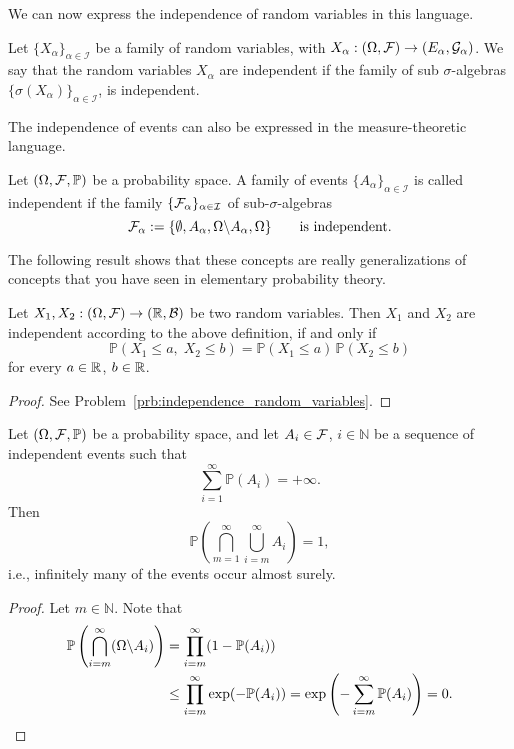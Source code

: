 We can now express the independence of random variables in this language.

\begin{definition}
	Let $\{X_\alpha\}_{\alpha \in \mathcal{I}}$ be a family of random variables, with $X_\alpha:(\Omega, \mathcal F) \to (E_\alpha, \mathcal{G}_\alpha)$. We say that the random variables $X_\alpha$ are independent if the family of sub $\sigma$-algebras $\{\sigma(X_\alpha)\}_{\alpha \in \mathcal{I}}$, is independent.
\end{definition}

The independence of events can also be expressed in the measure-theoretic language.

\begin{definition}
	Let $(\Omega, \mathcal F, \mathbb{P})$ be a probability space. A family of events $\{A_\alpha\}_{\alpha \in \mathcal{I}}$ is called independent if the family $\{ \mathcal F_\alpha \}_{\alpha\in\mathcal{I}}$ of sub-$\sigma$-algebras
	\[
	\mathcal F_\alpha := \{ \emptyset, A_\alpha, \Omega \backslash A_\alpha, \Omega \}\qquad\text{is independent.}
	\]	
\end{definition}

The following result shows that these concepts are really generalizations of concepts that you have seen in elementary probability theory.

\begin{lemma}\label{lem:independence_random_variables}
Let $X_1, X_2: (\Omega, \mathcal F) \to (\mathbb R, \mathcal B)$ be two random variables. Then $X_1$ and $X_2$ are independent according to the above definition, if and only if 
	\[
	\mathbb{P}( X_1 \leq a,\; X_2 \leq b ) = \mathbb{P}(X_1 \leq a)\, \mathbb{P}(X_2 \leq b)
	\]
	for every $a \in \mathbb R$, $b \in \mathbb R$.
\end{lemma}

\begin{proof}
See Problem~\ref{prb:independence_random_variables}.
\end{proof}

\begin{theorem}
	Let $(\Omega, \mathcal F, \mathbb{P})$ be a probability space, and let $A_i \in \mathcal F$, $i \in \mathbb{N}$ be a sequence of independent events such that
	\[
		\sum_{i=1}^\infty \mathbb{P}(A_i) = +\infty.
	\]
	Then
	\[
	\mathbb{P} \left( \bigcap_{m = 1}^\infty \bigcup_{i=m}^\infty A_i \right) = 1,
	\]
	i.e., infinitely many of the events occur almost surely.
\end{theorem}
\begin{proof}
	Let $m \in \mathbb{N}$. Note that
	\begin{align*}
	\mathbb{P}\left(\bigcap_{i=m}^{\infty} (\Omega \backslash A_i) \right) &= 
	\prod_{i=m}^\infty (1 - \mathbb{P}(A_i)) \\
	&\leq \prod_{i=m}^\infty \exp(- \mathbb{P}(A_i)) 
	= \exp\left(- \sum_{i=m}^\infty \mathbb{P}(A_i)\right) = 0.\qedhere
	\end{align*}
\end{proof}

